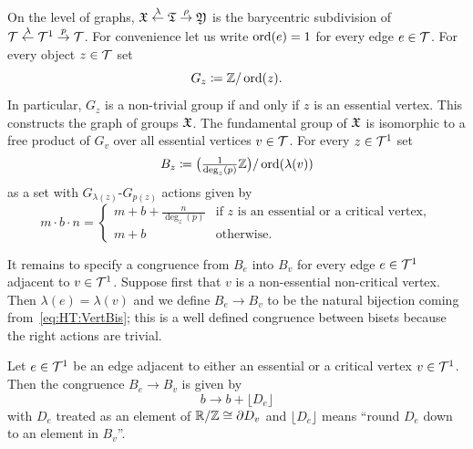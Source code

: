 \documentclass{amsart}
\begin{document}
On the level of graphs, ${\mathfrak X} \overset\lambda\leftarrow \mathfrak
T\overset\rho\rightarrow\mathfrak Y$ is the barycentric subdivision of
${\mathcal T}\overset\lambda\leftarrow {\mathcal T}^1\overset p\rightarrow {\mathcal T}$. For
convenience let us write $\operatorname{ord}(e)=1$ for every edge $e\in {\mathcal T}$. For every
object $z\in {\mathcal T}$ set
\[G_z\coloneqq {\mathbb Z}/\operatorname{ord}(z).
\]
In particular, $G_z$ is a non-trivial group if and only if $z$ is an
essential vertex. This constructs the graph of groups ${\mathfrak X}$. The
fundamental group of ${\mathfrak X}$ is isomorphic to a free product of $G_v$ over
all essential vertices $v\in {\mathcal T}$. For every $z\in {\mathcal T}^1$ set
\begin{equation}
\label{eq:HT:VertBis}B_z \coloneqq \big(\tfrac{1}{\deg_z(p)}{\mathbb Z} \big)/\operatorname{ord}(\lambda(v))\end{equation}
as a set with $G_{\lambda(z)}$-$G_{p(z)}$ actions given by
\begin{equation}\label{eq:HT:VertBis:Act}
  m\cdot b\cdot n=\begin{cases} m+b+\frac{n}{\deg_z(p)} & \text{if $z$ is an essential or a critical vertex},\\ m+b &\text{otherwise}. 
\end{cases}
\end{equation}

It remains to specify a congruence from $B_e$ into $B_v$ for every edge
$e\in {\mathcal T}^1$ adjacent to $v\in {\mathcal T}^1$. Suppose first that $v$ is a
non-essential non-critical vertex. Then $\lambda(e)=\lambda(v)$ and we
define $B_e\to B_v$ to be the natural bijection coming
from~\eqref{eq:HT:VertBis}; this is a well defined congruence between
bisets because the right actions are trivial.

Let $e\in {\mathcal T}^1$ be an edge adjacent to either an essential or a critical
vertex $v\in {\mathcal T}^1$. Then the congruence $B_e\to B_v$ is given by
\[b\to b+\lfloor D_e\rfloor
\]
with $D_e$ treated as an element of ${\mathbb R}/{\mathbb Z}\cong \partial D_v$ and $\lfloor
D_e\rfloor$ means ``round $D_e$ down to an element in $B_v$''.
\end{document}
